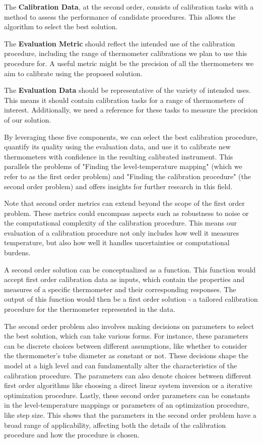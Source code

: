 \begin{bibunit}
The \textbf{Calibration Data}, at the second order, consists of calibration tasks with a method to assess the performance of candidate procedures. This allows the algorithm to select the best solution.

The \textbf{Evaluation Metric} should reflect the intended use of the calibration procedure, including the range of thermometer calibrations we plan to use this procedure for. A useful metric might be the precision of all the thermometers we aim to calibrate using the proposed solution.

The \textbf{Evaluation Data} should be representative of the variety of intended uses. This means it should contain calibration tasks for a range of thermometers of interest. Additionally, we need a reference for these tasks to measure the precision of our solution.

By leveraging these five components, we can select the best calibration procedure, quantify its quality using the evaluation data, and use it to calibrate new thermometers with confidence in the resulting calibrated instrument. This parallels the problems of "Finding the level-temperature mapping" (which we refer to as the first order problem) and "Finding the calibration procedure" (the second order problem) and offers insights for further research in this field.

Note that second order metrics can extend beyond the scope of the first order problem. These metrics could encompass aspects such as robustness to noise or the computational complexity of the calibration procedure. This means our evaluation of a calibration procedure not only includes how well it measures temperature, but also how well it handles uncertainties or computational burdens.

A second order solution can be conceptualized as a function. This function would accept first order calibration data as inputs, which contain the properties and measures of a specific thermometer and their corresponding responses. The output of this function would then be a first order solution - a tailored calibration procedure for the thermometer represented in the data.

The second order problem also involves making decisions on parameters to select the best solution, which can take various forms. For instance, these parameters can be discrete choices between different assumptions, like whether to consider the thermometer's tube diameter as constant or not. These decisions shape the model at a high level and can fundamentally alter the characteristics of the calibration procedure. The parameters can also denote choices between different first order algorithms like choosing a direct linear system inversion or a iterative optimization procedure. Lastly, these second order parameters can be constants in the level-temperature mappings or parameters of an optimization procedure, like step size. This shows that the parameters in the second order problem have a broad range of applicability, affecting both the details of the calibration procedure and how the procedure is chosen.



\end{bibunit}
